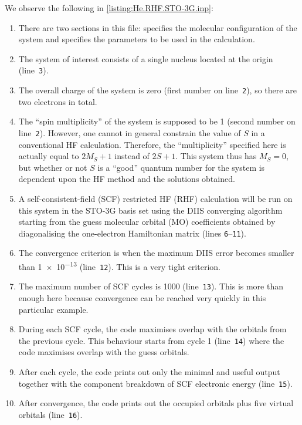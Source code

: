 		We observe the following in \cref{listing:He.RHF.STO-3G.inp}:
			\begin{enumerate}
				\item There are two sections in this file:  specifies the molecular configuration of the system and  specifies the parameters to be used in the calculation.
				\item The system of interest consists of a single  nucleus located at the origin (line~\texttt{3}).
				\item The overall charge of the system is zero (first number on line~\texttt{2}), so there are two electrons in total.
				\item The ``spin multiplicity'' of the system is supposed to be \SI{1}{} (second number on line~\texttt{2}).
				However, one cannot in general constrain the value of $S$ in a conventional HF calculation.
				Therefore, the ``multiplicity'' specified here is actually equal to $2M_S + 1$ instead of $2S + 1$.
				This system thus has $M_S = 0$, but whether or not $S$ is a ``good'' quantum number for the system is dependent upon the HF method and the solutions obtained.
				\item A self-consistent-field (SCF) restricted HF (RHF) calculation will be run on this system in the STO-3G basis set using the DIIS converging algorithm starting from the guess molecular orbital (MO) coefficients obtained by diagonalising the one-electron Hamiltonian matrix (lines \texttt{6}--\texttt{11}).
				\item The convergence criterion is when the maximum DIIS error becomes smaller than \SI{1e-13}{} (line~\texttt{12}). This is a very tight criterion.
				\item The maximum number of SCF cycles is \SI{1000}{} (line~\texttt{13}). This is more than enough here because convergence can be reached very quickly in this particular example.
				\item During each SCF cycle, the code maximises overlap with the orbitals from the previous cycle. This behaviour starts from cycle 1 (line~\texttt{14}) where the code maximises overlap with the guess orbitals.
				\item After each cycle, the code prints out only the minimal and useful output together with the component breakdown of SCF electronic energy (line~\texttt{15}).
				\item After convergence, the code prints out the occupied orbitals plus five virtual orbitals (line~\texttt{16}).
			\end{enumerate}
	
